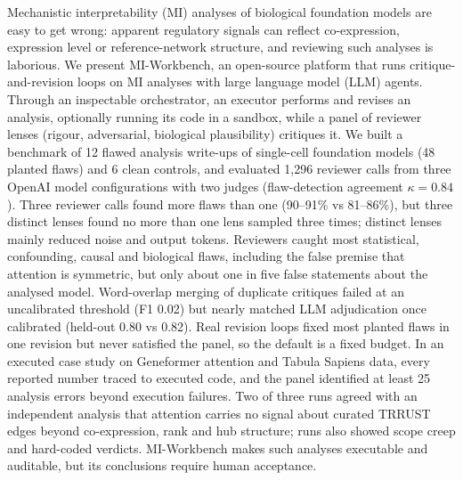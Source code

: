 Mechanistic interpretability (MI) analyses of biological foundation models are easy to get wrong: apparent regulatory signals can reflect co-expression, expression level or reference-network structure, and reviewing such analyses is laborious. We present MI-Workbench, an open-source platform that runs critique-and-revision loops on MI analyses with large language model (LLM) agents. Through an inspectable orchestrator, an executor performs and revises an analysis, optionally running its code in a sandbox, while a panel of reviewer lenses (rigour, adversarial, biological plausibility) critiques it. We built a benchmark of 12 flawed analysis write-ups of single-cell foundation models (48 planted flaws) and 6 clean controls, and evaluated 1,296 reviewer calls from three OpenAI model configurations with two judges (flaw-detection agreement $\kappa=0.84$). Three reviewer calls found more flaws than one (90--91\% vs 81--86\%), but three distinct lenses found no more than one lens sampled three times; distinct lenses mainly reduced noise and output tokens. Reviewers caught most statistical, confounding, causal and biological flaws, including the false premise that attention is symmetric, but only about one in five false statements about the analysed model. Word-overlap merging of duplicate critiques failed at an uncalibrated threshold (F1 0.02) but nearly matched LLM adjudication once calibrated (held-out 0.80 vs 0.82). Real revision loops fixed most planted flaws in one revision but never satisfied the panel, so the default is a fixed budget. In an executed case study on Geneformer attention and Tabula Sapiens data, every reported number traced to executed code, and the panel identified at least 25 analysis errors beyond execution failures. Two of three runs agreed with an independent analysis that attention carries no signal about curated TRRUST edges beyond co-expression, rank and hub structure; runs also showed scope creep and hard-coded verdicts. MI-Workbench makes such analyses executable and auditable, but its conclusions require human acceptance.
